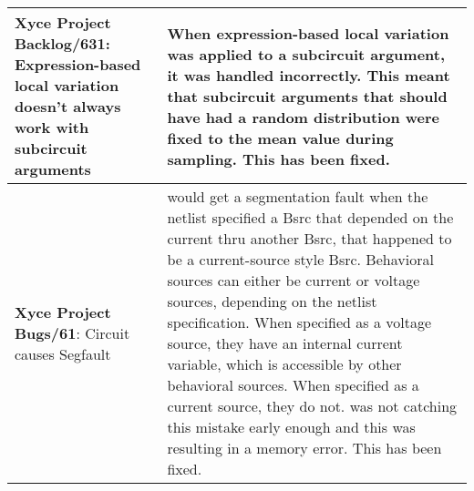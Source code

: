 {\begin{longtable}[h] {>{\raggedright\small}m{2in}|>{\raggedright\let\\\tabularnewline\small}m{3.5in}}
 \textbf{Xyce Project Backlog/631}: 
  Expression-based local variation doesn't always work with subcircuit arguments & 
  When expression-based local variation was applied to a subcircuit argument, it 
  was handled incorrectly.  This meant that subcircuit arguments that should have 
  had a random distribution were fixed to the mean value during sampling.  
  This has been fixed.  \\ \hline

   \textbf{Xyce Project Bugs/61}: Circuit causes Segfault &
   \Xyce{} would get a segmentation fault when the netlist specified a Bsrc that depended on the current thru another Bsrc, that happened to be a current-source style Bsrc.  Behavioral sources can either be current or voltage sources, depending on the netlist specification.  When specified as a voltage source, they have an internal current variable, which is accessible by other behavioral sources.   When specified as a current source, they do not.  \Xyce{} was not catching this mistake early enough and this was resulting in a memory error.  This has been fixed. \\ \hline



\end{longtable}
}
